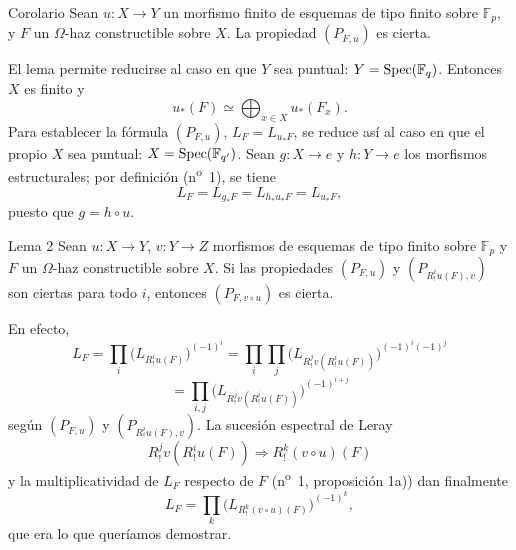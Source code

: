\begin{statement}{Corolario}
Sean $u:X\to Y$ un morfismo finito de esquemas de tipo finito sobre $\mathbb F_p$, y $F$ un $\Omega$-haz constructible sobre $X$. La propiedad $(P_{F,u})$ es cierta.
\end{statement}

El lema permite reducirse al caso en que $Y$ sea puntual: $Y=\operatorname{Spec}(\mathbb F_q)$. Entonces $X$ es finito y
\[
u_*(F)\simeq \bigoplus_{x\in X}u_*(F_x).
\]
Para establecer la fórmula $(P_{F,u})$, $L_F=L_{u_*F}$, se reduce así al caso en que el propio $X$ sea puntual: $X=\operatorname{Spec}(\mathbb F_{q'})$. Sean $g:X\to e$ y $h:Y\to e$ los morfismos estructurales; por definición (n\textsuperscript{o}~1), se tiene
\[
L_F=L_{g_*F}=L_{h_*u_*F}=L_{u_*F},
\]
puesto que $g=h\circ u$.

\begin{statement}{Lema 2}
Sean $u:X\to Y$, $v:Y\to Z$ morfismos de esquemas de tipo finito sobre $\mathbb F_p$ y $F$ un $\Omega$-haz constructible sobre $X$. Si las propiedades $(P_{F,u})$ y $(P_{R^i_!u(F),v})$ son ciertas para todo $i$, entonces $(P_{F,v\circ u})$ es cierta.
\end{statement}

En efecto,
\[
L_F=\prod_i\bigl(L_{R^i_!u(F)}\bigr)^{(-1)^i}
 =\prod_i\prod_j\bigl(L_{R^j_!v(R^i_!u(F))}\bigr)^{(-1)^i(-1)^j}
\]
\[
=\prod_{i,j}\bigl(L_{R^j_!v(R^i_!u(F))}\bigr)^{(-1)^{i+j}}
\]
según $(P_{F,u})$ y $(P_{R^i_!u(F),v})$. La sucesión espectral de Leray
\[
R^j_!v(R^i_!u(F))\Longrightarrow R^k_!(v\circ u)(F)
\]
y la multiplicatividad de $L_F$ respecto de $F$ (n\textsuperscript{o}~1, proposición 1a)) dan finalmente
\[
L_F=\prod_k\bigl(L_{R^k_!(v\circ u)(F)}\bigr)^{(-1)^k},
\]
que era lo que queríamos demostrar.
